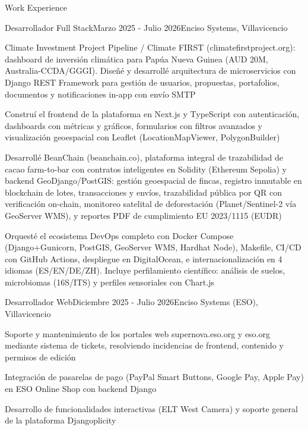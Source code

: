 \documentclass{resume} %
\begin{document}

\begin{rSection}{Work Experience}

\begin{rSubsection}{Desarrollador Full Stack}{Marzo 2025 - Julio 2026}{Enciso Systems, Villavicencio}{}

\item Climate Investment Project Pipeline / Climate FIRST (climatefirstproject.org): dashboard de inversi\'on clim\'atica para Pap\'ua Nueva Guinea (AUD 20M, Australia-CCDA/GGGI). Dise\~n\'e y desarroll\'e arquitectura de microservicios con Django REST Framework para gesti\'on de usuarios, propuestas, portafolios, documentos y notificaciones in-app con env\'io SMTP
\item Constru\'i el frontend de la plataforma en Next.js y TypeScript con autenticaci\'on, dashboards con m\'etricas y gr\'aficos, formularios con filtros avanzados y visualizaci\'on geoespacial con Leaflet (LocationMapViewer, PolygonBuilder)
\item Desarroll\'e BeanChain (beanchain.co), plataforma integral de trazabilidad de cacao farm-to-bar con contratos inteligentes en Solidity (Ethereum Sepolia) y backend GeoDjango/PostGIS: gesti\'on geoespacial de fincas, registro inmutable en blockchain de lotes, transacciones y env\'ios, trazabilidad p\'ublica por QR con verificaci\'on on-chain, monitoreo satelital de deforestaci\'on (Planet/Sentinel-2 v\'ia GeoServer WMS), y reportes PDF de cumplimiento EU 2023/1115 (EUDR)
\item Orquest\'e el ecosistema DevOps completo con Docker Compose (Django+Gunicorn, PostGIS, GeoServer WMS, Hardhat Node), Makefile, CI/CD con GitHub Actions, despliegue en DigitalOcean, e internacionalizaci\'on en 4 idiomas (ES/EN/DE/ZH). Incluye perfilamiento cient\'ifico: an\'alisis de suelos, microbiomas (16S/ITS) y perfiles sensoriales con Chart.js

\end{rSubsection}

\begin{rSubsection}{Desarrollador Web}{Diciembre 2025 - Julio 2026}{Enciso Systems (ESO), Villavicencio}{}

\item Soporte y mantenimiento de los portales web supernova.eso.org y eso.org mediante sistema de tickets, resolviendo incidencias de frontend, contenido y permisos de edici\'on
\item Integraci\'on de pasarelas de pago (PayPal Smart Buttons, Google Pay, Apple Pay) en ESO Online Shop con backend Django
\item Desarrollo de funcionalidades interactivas (ELT West Camera) y soporte general de la plataforma Djangoplicity


\end{rSubsection}
\end{rSection}
\end{document}

